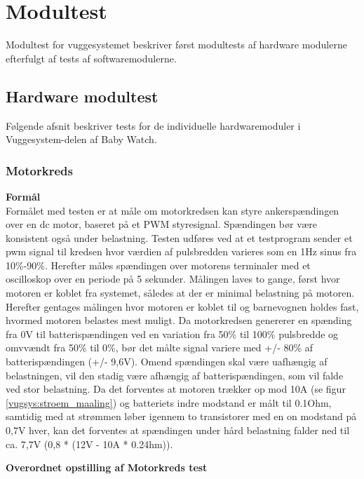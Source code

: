 \section{Modultest}
Modultest for vuggesystemet beskriver først modultests af hardware modulerne efterfulgt af tests af softwaremodulerne. 
\subsection{Hardware modultest}
Følgende afsnit beskriver tests for de individuelle hardwaremoduler i Vuggesystem-delen af Baby Watch.
\subsubsection{Motorkreds}
\textbf{Formål} \\
Formålet med testen er at måle om motorkredsen kan styre ankerspændingen over en dc motor, baseret på et PWM styresignal. Spændingen bør være konsistent også under belastning. Testen udføres ved at et testprogram sender et pwm signal til kredsen hvor værdien af pulsbredden varieres som en 1Hz sinus fra 10\%-90\%. Herefter måles spændingen over motorens terminaler med et oscilloskop over en periode på 5 sekunder. Målingen laves to gange, først hvor motoren er koblet fra systemet, således at der er minimal belastning på motoren. Herefter gentages målingen hvor motoren er koblet til og barnevognen holdes fast, hvormed motoren belastes mest muligt. Da motorkredsen genererer en spænding fra 0V til batterispændingen ved en variation fra 50\% til 100\% pulsbredde og omvvændt fra 50\% til 0\%, bør det målte signal variere med +/- 80\% af batterispændingen (+/- 9,6V). Omend spændingen skal være uafhængig af belastningen, vil den stadig være afhængig af batterispændingen, som vil falde ved stor belastning. Da det forventes at motoren trækker op mod 10A (se figur \vref{vugsys:stroem_maaling}) og batteriets indre modstand er målt til 0.1Ohm, samtidig med at strømmen løber igennem to transistorer med en on modstand på 0,7V hver, kan det forventes at spændingen under hård belastning falder ned til ca. 7,7V (0,8 * (12V - 10A * 0.24hm)). 

\textbf{Overordnet opstilling af Motorkreds test}

